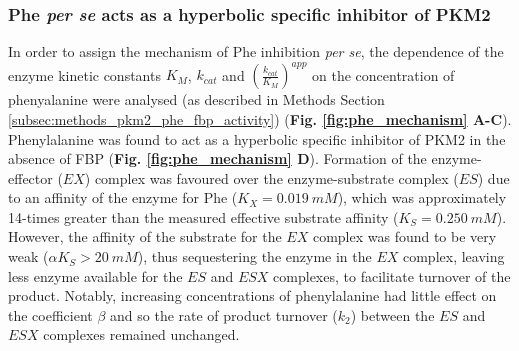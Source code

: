 \subsubsection{Phe \textit{per se} acts as a hyperbolic specific inhibitor of PKM2}
In order to assign the mechanism of Phe inhibition \textit{per se}, the dependence of the enzyme kinetic constants $K_{M}$, $k_{cat}$ and $(\frac{k_{cat}}{K_{M}})^{app}$ on the concentration of phenyalanine were analysed (as described in Methods Section \ref{subsec:methods_pkm2_phe_fbp_activity}) (\textbf{Fig. \ref{fig:phe_mechanism} A-C}). Phenylalanine was found to act as a hyperbolic specific inhibitor of PKM2 in the absence of FBP (\textbf{Fig. \ref{fig:phe_mechanism} D}). Formation of the enzyme-effector ($EX$) complex was favoured over the enzyme-substrate complex ($ES$) due to an affinity of the enzyme for Phe ($K_{X} = 0.019 \: mM$), which was approximately 14-times greater than the measured effective substrate affinity ($K_{S} = 0.250 \: mM$). However, the affinity of the substrate for the $EX$ complex was found to be very weak ($\alpha K_{S} > 20 \: mM$), thus sequestering the enzyme in the  $EX$ complex, leaving less enzyme available for the $ES$ and $ESX$ complexes, to facilitate turnover of the product. Notably, increasing concentrations of phenylalanine had little effect on the coefficient $\beta$ and so the rate of product turnover ($k_{2}$) between the $ES$ and $ESX$ complexes remained unchanged. 

